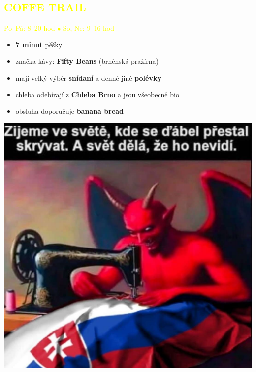 \documentclass{article}
\newcommand{\podnadpisy}[1]{
  \subsection*{\textcolor{yellow}{#1}}
}
\begin{document}
\noindent \begin{minipage}{0.7\textwidth}
    \podnadpisy{COFFE TRAIL}
  \textcolor{yellow}{Po--Pá: 8--20 hod $\bullet$ So, Ne: 9--16 hod}
  \small
  \begin{itemize}[leftmargin=10pt]
    \item \textbf{7 minut} pěšky
    \item značka kávy: \textbf{Fifty Beans} (brněnská pražírna)
    \item mají velký výběr \textbf{snídaní} a denně jiné \textbf{polévky}
    \item chleba odebírají z \textbf{Chleba Brno} a jsou všeobecně bio
    \item obsluha doporučuje \textbf{banana bread}
  \end{itemize}
\end{minipage}
\hfill
\begin{minipage}{0.27\textwidth}
  \includegraphics[width=\linewidth]{dulezite.jpg}
\end{minipage}
\end{document}
